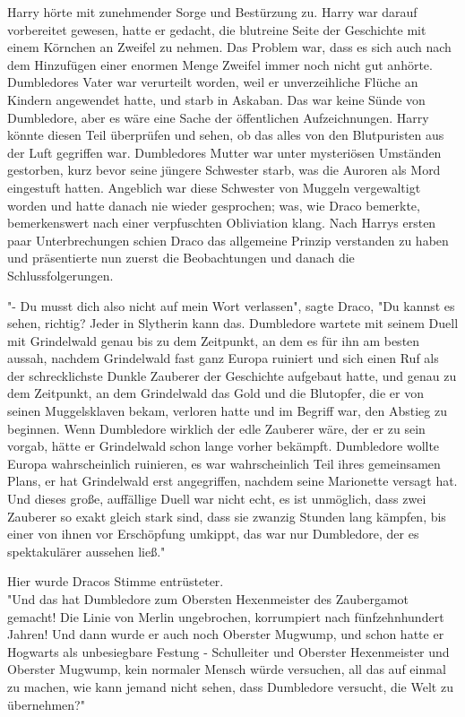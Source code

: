 {Harry hörte mit zunehmender Sorge und Bestürzung zu. Harry war darauf vorbereitet gewesen, hatte er gedacht, die blutreine Seite der Geschichte mit einem Körnchen an Zweifel zu nehmen. Das Problem war, dass es sich auch nach dem Hinzufügen einer enormen Menge Zweifel immer noch nicht gut anhörte. Dumbledores Vater war verurteilt worden, weil er unverzeihliche Flüche an Kindern angewendet hatte, und starb in Askaban. Das war keine Sünde von Dumbledore, aber es wäre eine Sache der öffentlichen Aufzeichnungen. Harry könnte diesen Teil überprüfen und sehen, ob das alles von den Blutpuristen aus der Luft gegriffen war. Dumbledores Mutter war unter mysteriösen Umständen gestorben, kurz bevor seine jüngere Schwester starb, was die Auroren als Mord eingestuft hatten. Angeblich war diese Schwester von Muggeln vergewaltigt worden und hatte danach nie wieder gesprochen; was, wie Draco bemerkte, bemerkenswert nach einer verpfuschten Obliviation klang. Nach Harrys ersten paar Unterbrechungen schien Draco das allgemeine Prinzip verstanden zu haben und präsentierte nun zuerst die Beobachtungen und danach die Schlussfolgerungen.

"- Du musst dich also nicht auf mein Wort verlassen", sagte Draco, "Du kannst es sehen, richtig? Jeder in Slytherin kann das. Dumbledore wartete mit seinem Duell mit Grindelwald genau bis zu dem Zeitpunkt, an dem es für ihn am besten aussah, nachdem Grindelwald fast ganz Europa ruiniert und sich einen Ruf als der schrecklichste Dunkle Zauberer der Geschichte aufgebaut hatte, und genau zu dem Zeitpunkt, an dem Grindelwald das Gold und die Blutopfer, die er von seinen Muggelsklaven bekam, verloren hatte und im Begriff war, den Abstieg zu beginnen. Wenn Dumbledore wirklich der edle Zauberer wäre, der er zu sein vorgab, hätte er Grindelwald schon lange vorher bekämpft. Dumbledore wollte Europa wahrscheinlich ruinieren, es war wahrscheinlich Teil ihres gemeinsamen Plans, er hat Grindelwald erst angegriffen, nachdem seine Marionette versagt hat. Und dieses große, auffällige Duell war nicht echt, es ist unmöglich, dass zwei Zauberer so exakt gleich stark sind, dass sie zwanzig Stunden lang kämpfen, bis einer von ihnen vor Erschöpfung umkippt, das war nur Dumbledore, der es spektakulärer aussehen ließ."

Hier wurde Dracos Stimme entrüsteter.\\ "Und das hat Dumbledore zum Obersten Hexenmeister des Zaubergamot gemacht! Die Linie von Merlin ungebrochen, korrumpiert nach fünfzehnhundert Jahren! Und dann wurde er auch noch Oberster Mugwump, und schon hatte er Hogwarts als unbesiegbare Festung - Schulleiter und Oberster Hexenmeister und Oberster Mugwump, kein normaler Mensch würde versuchen, all das auf einmal zu machen, wie kann jemand nicht sehen, dass Dumbledore versucht, die Welt zu übernehmen?"

}
